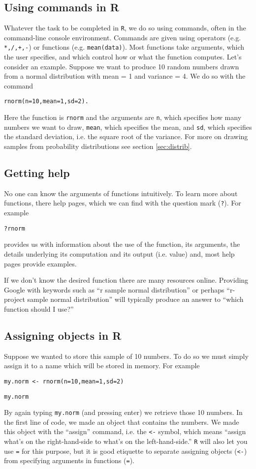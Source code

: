 \documentclass[12pt]{article}
\newcommand{\R}[1] {
	\item \texttt{#1}
}
\newenvironment{verbatim}{ 
	\indent
	\begin{list}{}{\setlength{\itemsep}{-1.5mm}}
}{
	\end{list}
}
\begin{document}
\subsection{Using commands in R}	
\label{sec:commands}  Whatever the task to be completed in \verb+R+, we do so using commands, often in the command-line console environment.  Commands are given using operators (e.g. \verb&*,/,+,-&) or functions (e.g. \verb+mean(data)+).  Most functions take arguments, which the user specifies, and which control how or what the function computes.  Let's consider an example.  Suppose we want to produce 10 random numbers drawn from a normal distribution with mean = 1 and variance = 4.  We do so with the command 
\begin{verbatim}
	\R{rnorm(n=10,mean=1,sd=2).}
\end{verbatim}
Here the function is \verb+rnorm+ and the arguments are \verb+n+, which specifies how many numbers we want to draw, \verb+mean+, which specifies the mean, and \verb+sd+, which specifies the standard deviation, i.e. the square root of the variance.  For more on drawing samples from probability distributions see section \ref{sec:distrib}.

\subsection{Getting help}	\label{sec:help}
No one can know the arguments of functions intuitively.  To learn more about functions, there help pages, which we can find with the question mark (\verb+?+).  For example
\begin{verbatim}
	\R{?rnorm}
\end{verbatim}
provides us with information about the use of the function, its arguments, the details underlying its computation and its output (i.e. value) and, most help pages provide examples.

If we don't know the desired function there are many resources online.  Providing Google with keywords such as ``r sample normal distribution'' or perhaps ``r-project sample normal distribution'' will typically produce an answer to ``which function should I use?''

\subsection{Assigning objects in R}
Suppose we wanted to store this sample of 10 numbers.  To do so we must simply assign it to a name which will be stored in memory.  For example 
\begin{verbatim}
	\R{my.norm <- rnorm(n=10,mean=1,sd=2)}
	\R{my.norm}
\end{verbatim}
By again typing \verb+my.norm+ (and pressing enter) we retrieve those 10 numbers.  In the first line of code, we made an object that contains the numbers.  We made this object with the ``assign'' command, i.e. the \verb+<-+ symbol, which means ``assign what's on the right-hand-side to what's on the left-hand-side.''  \verb+R+ will also let you use \verb+=+ for this purpose, but it is good etiquette to separate assigning objects (\verb+<-+) from specifying arguments in functions (\verb+=+).
\end{document}
